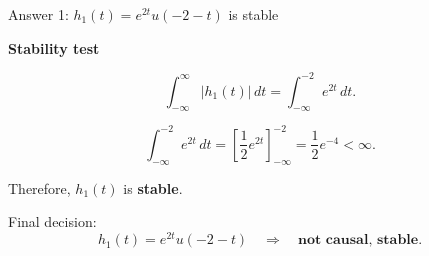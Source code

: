 \documentclass[aspectratio=169,11pt]{beamer}
\newcommand{\CardTitleSize}{\large}
\newcommand{\CardTitle}[1]{%
  \vspace{0.15cm}
  {\CardTitleSize\bfseries #1}\par
}
\begin{document}
\begin{frame}{Answer 1: \(h_1(t)=e^{2t}u(-2-t)\) is stable}

\begin{center}
\begin{GreenCard}[
  width=0.86\textwidth,
  halign=center,
  top=12pt,
  bottom=12pt
]
\CardTitle{Stability test}

\vspace{0.08cm}

\[
\int_{-\infty}^{\infty}|h_1(t)|\,dt
=
\int_{-\infty}^{-2} e^{2t}\,dt.
\]

\vspace{0.08cm}

\[
\int_{-\infty}^{-2} e^{2t}\,dt
=
\left[\frac{1}{2}e^{2t}\right]_{-\infty}^{-2}
=
\frac{1}{2}e^{-4}
<\infty.
\]

\vspace{0.12cm}

\begin{GreenBox}[
  calloutshadedgreen,
  halign=center,
  fontupper=\Large
]{}
Therefore, \(h_1(t)\) is \textbf{stable}.
\end{GreenBox}

\vspace{0.08cm}

\begin{BlueBox}[
  calloutshadedblue,
  halign=center,
  fontupper=\large
]{}
Final decision:
\[
h_1(t)=e^{2t}u(-2-t)
\quad\Rightarrow\quad
\textbf{not causal, stable}.
\]
\end{BlueBox}

\end{GreenCard}
\end{center}

\end{frame}
\end{document}
